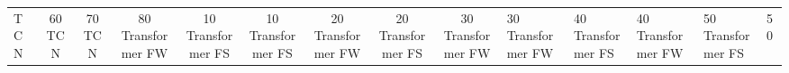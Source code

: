 \begin{table}
\begin{tabular}{|l|c|c|c|c|c|c|c|c|}
TCN & 60%
TCN & 70%
TCN & 80%
Transformer FW & 10%
Transformer FS & 10%
Transformer FS & 20%
Transformer FW & 20%
Transformer FS & 30%
Transformer FW & 30%
Transformer FW & 40%
Transformer FS & 40%
Transformer FW & 50%
Transformer FS & 50%

\end{tabular}
\end{table}
